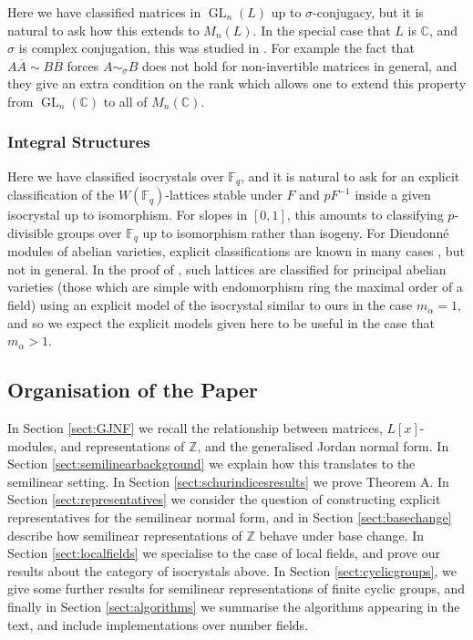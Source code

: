 \documentclass[10pt, reqno, hidelinks]{amsart}
\DeclareMathOperator{\GL}{GL}
\newcommand{\bC}{{\mathbb C}}
\newcommand{\bF}{{\mathbb F}}
\newcommand{\bZ}{{\mathbb Z}}
\numberwithin{thm}{subsection}
\theoremstyle{definition}
\begin{document}
Here we have classified matrices in $\GL_n(L)$ up to $\sigma$-conjugacy, but it is natural to ask how this extends to $M_n(L)$. In the special case that $L$ is $\bC$, and $\sigma$ is complex conjugation, this was studied in \cite{HongHorn}. For example the fact that $A \overline{A} \sim B \overline{B}$ forces $A \sim_{\sigma} B$ does not hold for non-invertible matrices in general, and they give an extra condition on the rank which allows one to extend this property from $\GL_n(\bC)$ to all of $M_n(\bC)$.

\subsubsection*{Integral Structures}

Here we have classified isocrystals over $\bF_q$, and it is natural to ask for an explicit classification of the $W(\bF_q)$-lattices stable under $F$ and $p F^{-1}$ inside a given isocrystal up to isomorphism. For slopes in $[0,1]$, this amounts to classifying $p$-divisible groups over $\bF_q$ up to isomorphism rather than isogeny. For Dieudonn\'{e} modules of abelian varieties, explicit classifications are known in many cases \cite{BKM, WaterhouseAV}, but not in general. In the proof of \cite[Thm.\ 5.1]{WaterhouseAV}, such lattices are classified for principal abelian varieties (those which are simple with endomorphism ring the maximal order of a field) using an explicit model of the isocrystal similar to ours in the case $m_{\alpha} = 1$, and so we expect the explicit models given here to be useful in the case that $m_{\alpha} > 1$.

\subsection*{Organisation of the Paper}

In Section \ref{sect:GJNF} we recall the relationship between matrices, $L[x]$-modules, and representations of $\bZ$, and the generalised Jordan normal form. In Section \ref{sect:semilinearbackground} we explain how this translates to the semilinear setting. In Section \ref{sect:schurindicesresults} we prove Theorem A. In Section \ref{sect:representatives} we consider the question of constructing explicit representatives for the semilinear normal form, and in Section \ref{sect:basechange} describe how semilinear representations of $\bZ$ behave under base change. In Section \ref{sect:localfields} we specialise to the case of local fields, and prove our results about the category of isocrystals above. In Section \ref{sect:cyclicgroups}, we give some further results for semilinear representations of finite cyclic groups, and finally in Section \ref{sect:algorithms} we summarise the algorithms appearing in the text, and include implementations over number fields.
\end{document}
